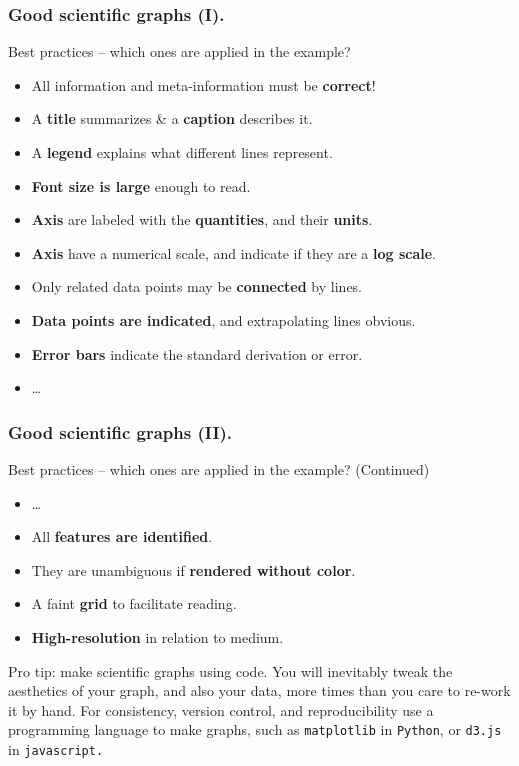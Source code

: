 \documentclass{beamer} %
\newcommand\emc[1]{\textcolor{brightblue}{\textbf{#1}}}
\begin{document}
\begin{frame}

\frametitle{Good scientific graphs (I).}

Best practices -- which ones are applied in the example?
\begin{itemize}
\item All information and meta-information must be \emc{correct}!
\item A \emc{title} summarizes \& a \emc{caption} describes it.
\item A \emc{legend} explains what different lines represent.
\item \emc{Font size is large} enough to read.
\item \emc{Axis} are labeled with the \emc{quantities}, and their \emc{units}.
\item \emc{Axis} have a numerical scale, and indicate if they are a \emc{log scale}.
\item Only related data points may be \emc{connected} by lines.
\item \emc{Data points are indicated}, and extrapolating lines obvious.
\item \emc{Error bars} indicate the standard derivation or error.
\item \ldots
\end{itemize}

\end{frame}

\begin{frame}

\frametitle{Good scientific graphs (II).}

Best practices -- which ones are applied in the example? (Continued)
\begin{itemize}
\item \ldots
\item All \emc{features are identified}.
\item They are unambiguous if \emc{rendered without color}.
\item A faint \emc{grid} to facilitate reading. 
\item \emc{High-resolution} in relation to medium.
\end{itemize}

\vspace{3mm}
\begin{block}{Pro tip: make scientific graphs using code.}
You will inevitably tweak the aesthetics of your graph, and also your data, more times than you care to re-work it by hand. For consistency, version control, and reproducibility use a programming language to make graphs, such as \texttt{matplotlib} in \texttt{Python}, or \texttt{d3.js} in \texttt{javascript.}
\end{block}

\end{frame}
\end{document}
